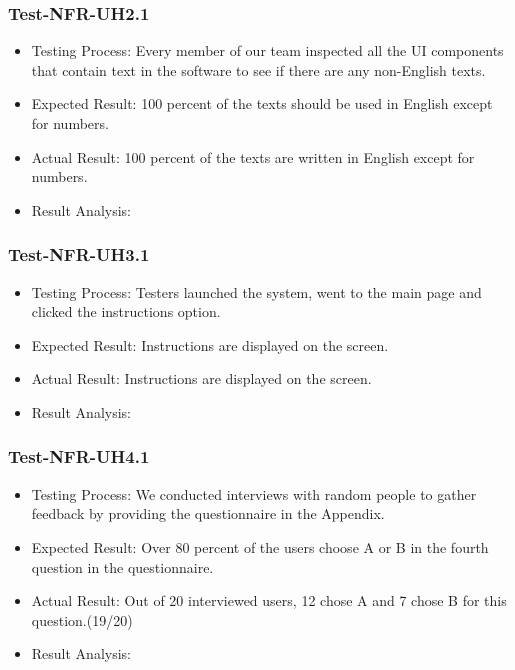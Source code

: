 \documentclass[12pt, titlepage]{article}
\begin{document}
\subsubsection{Test-NFR-UH2.1}
\begin{itemize}
    \item Testing Process: Every member of our team inspected all the UI components that contain text in the software to see if there are any non-English texts.
    \item Expected Result: 100 percent of the texts should be used in English except for numbers.
    \item Actual Result: 100 percent of the texts are written in English except for numbers.
    \item Result Analysis: \pass
\end{itemize}

            \subsubsection{Test-NFR-UH3.1}
\begin{itemize}
    \item Testing Process: Testers launched the system, went to the main page and clicked the instructions option.
    \item Expected Result: Instructions are displayed on the screen.
    \item Actual Result: Instructions are displayed on the screen.
    \item Result Analysis: \pass
\end{itemize}

            \subsubsection{Test-NFR-UH4.1}
\begin{itemize}
    \item Testing Process: We conducted interviews with random people to gather feedback by providing the questionnaire in the Appendix.
    \item Expected Result: Over 80 percent of the users choose A or B in the fourth question in the questionnaire.
    \item Actual Result: Out of 20 interviewed users, 12 chose A and 7 chose B for this question.(19/20)
    \item Result Analysis: \pass
\end{itemize}
\end{document}
